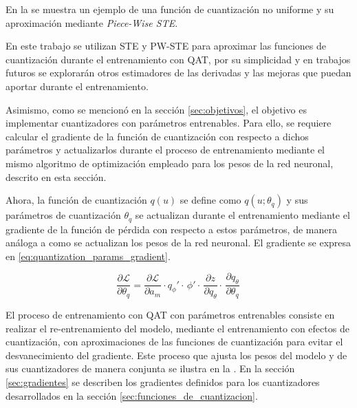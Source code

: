 En la  se muestra un ejemplo de una función de cuantización no uniforme y su aproximación mediante \textit{Piece-Wise STE}.





En este trabajo se utilizan STE y PW-STE para aproximar las funciones de cuantización durante el entrenamiento con QAT, por su simplicidad y en trabajos futuros se explorarán otros estimadores de las derivadas y las mejoras que puedan aportar durante el entrenamiento.

Asimismo, como se mencionó en la sección \ref{sec:objetivos}, el objetivo es implementar cuantizadores con parámetros entrenables. Para ello, se requiere calcular el gradiente de la función de cuantización con respecto a dichos parámetros y actualizarlos durante el proceso de entrenamiento mediante el mismo algoritmo de optimización empleado para los pesos de la red neuronal, descrito en esta sección.

Ahora, la función de cuantización $q(u)$ se define como $q(u; \theta_{q})$ y sus parámetros de cuantización $\theta_{q}$ se actualizan durante el entrenamiento mediante el gradiente de la función de pérdida con respecto a estos parámetros, de manera análoga a como se actualizan los pesos de la red neuronal. El gradiente se expresa en \eqref{eq:quantization_params_gradient}.

\begin{equation}
    \label{eq:quantization_params_gradient}
    \frac{\partial \mathcal{L}}{\partial \theta_{q}} =
    \frac{\partial \mathcal{L}}{\partial a_{m}} \cdot
        q_{\phi}' \cdot \,
        \phi' \cdot \,
        \frac{\partial z}{\partial q_{\theta}} \cdot \,
        \frac{\partial q_{\theta}}{\partial \theta_{q}} \,
\end{equation}

El proceso de entrenamiento con QAT con parámetros entrenables consiste en realizar el re-entrenamiento del modelo, mediante el entrenamiento con efectos de cuantización, con aproximaciones de las funciones de cuantización para evitar el desvanecimiento del gradiente. Este proceso que ajusta los pesos del modelo y de sus cuantizadores de manera conjunta se ilustra en la . En la sección \ref{sec:gradientes} se describen los gradientes definidos para los cuantizadores desarrollados en la sección \ref{sec:funciones_de_cuantizacion}.

